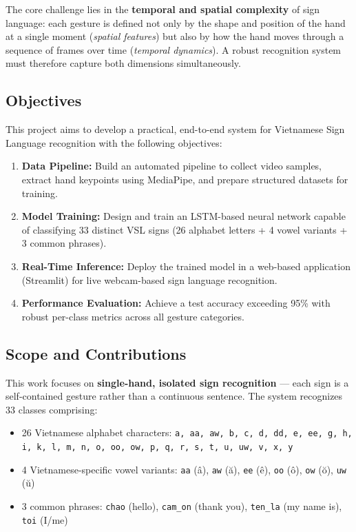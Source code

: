 \documentclass[12pt, a4paper]{article}
\begin{document}
The core challenge lies in the \textbf{temporal and spatial complexity} of sign language: each gesture is defined not only by the shape and position of the hand at a single moment (\textit{spatial features}) but also by how the hand moves through a sequence of frames over time (\textit{temporal dynamics}). A robust recognition system must therefore capture both dimensions simultaneously.

\subsection{Objectives}

This project aims to develop a practical, end-to-end system for Vietnamese Sign Language recognition with the following objectives:

\begin{enumerate}[label=(\roman*)]
    \item \textbf{Data Pipeline:} Build an automated pipeline to collect video samples, extract hand keypoints using MediaPipe, and prepare structured datasets for training.
    \item \textbf{Model Training:} Design and train an LSTM-based neural network capable of classifying 33 distinct VSL signs (26 alphabet letters + 4 vowel variants + 3 common phrases).
    \item \textbf{Real-Time Inference:} Deploy the trained model in a web-based application (Streamlit) for live webcam-based sign language recognition.
    \item \textbf{Performance Evaluation:} Achieve a test accuracy exceeding 95\% with robust per-class metrics across all gesture categories.
\end{enumerate}

\subsection{Scope and Contributions}

This work focuses on \textbf{single-hand, isolated sign recognition} — each sign is a self-contained gesture rather than a continuous sentence. The system recognizes 33 classes comprising:

\begin{itemize}
    \item 26 Vietnamese alphabet characters: \texttt{a, aa, aw, b, c, d, dd, e, ee, g, h, i, k, l, m, n, o, oo, ow, p, q, r, s, t, u, uw, v, x, y}
    \item 4 Vietnamese-specific vowel variants: \texttt{aa} (\^a), \texttt{aw} (\u{a}), \texttt{ee} (\^e), \texttt{oo} (\^o), \texttt{ow} (\u{o}), \texttt{uw} (\u{u})
    \item 3 common phrases: \texttt{chao} (hello), \texttt{cam\_on} (thank you), \texttt{ten\_la} (my name is), \texttt{toi} (I/me)
\end{itemize}
\end{document}
